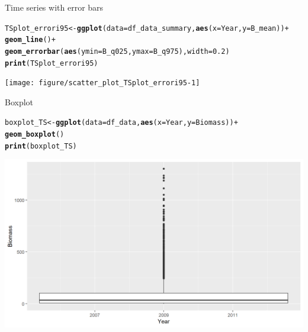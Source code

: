 \documentclass{beamer}\usepackage[]{graphicx}\usepackage[]{color}
\makeatletter
\newcommand{\hlnum}[1]{\textcolor[rgb]{0.686,0.059,0.569}{#1}}%
\newcommand{\hlopt}[1]{\textcolor[rgb]{0,0,0}{#1}}%
\newcommand{\hlstd}[1]{\textcolor[rgb]{0.345,0.345,0.345}{#1}}%
\newcommand{\hlkwb}[1]{\textcolor[rgb]{0.69,0.353,0.396}{#1}}%
\newcommand{\hlkwc}[1]{\textcolor[rgb]{0.333,0.667,0.333}{#1}}%
\newcommand{\hlkwd}[1]{\textcolor[rgb]{0.737,0.353,0.396}{\textbf{#1}}}%
\newenvironment{kframe}{%
 \def\at@end@of@kframe{}%
 \ifinner\ifhmode%
  \def\at@end@of@kframe{\end{minipage}}%
  \begin{minipage}{\columnwidth}%
 \fi\fi%
 \def\FrameCommand##1{\hskip\@totalleftmargin \hskip-\fboxsep
 \colorbox{shadecolor}{##1}\hskip-\fboxsep
     \hskip-\linewidth \hskip-\@totalleftmargin \hskip\columnwidth}%
 \MakeFramed {\advance\hsize-\width
   \@totalleftmargin\z@ \linewidth\hsize
   \@setminipage}}%
 {\par\unskip\endMakeFramed%
 \at@end@of@kframe}
\newenvironment{knitrout}{}{} %
\makeatother
\begin{document}
\begin{frame}[fragile]{Time series with error bars}
\begin{knitrout}\footnotesize
{}\color{fgcolor}\begin{kframe}
\begin{alltt}
\hlstd{TSplot_errori95} \hlkwb{<-} \hlkwd{ggplot}\hlstd{(}\hlkwc{data}\hlstd{=df_data_summary,} \hlkwd{aes}\hlstd{(}\hlkwc{x}\hlstd{=Year,} \hlkwc{y}\hlstd{=B_mean))} \hlopt{+}
  \hlkwd{geom_line}\hlstd{()} \hlopt{+}
  \hlkwd{geom_errorbar}\hlstd{(}\hlkwd{aes}\hlstd{(}\hlkwc{ymin} \hlstd{= B_q025,} \hlkwc{ymax} \hlstd{= B_q975),} \hlkwc{width} \hlstd{=} \hlnum{0.2}\hlstd{)}
\hlkwd{print}\hlstd{(TSplot_errori95)}
\end{alltt}
\end{kframe}

{\centering \texttt{[image: figure/scatter\_plot\_TSplot\_errori95-1]} 

}



\end{knitrout}
\end{frame}

\begin{frame}[fragile]{Boxplot}
\begin{knitrout}\footnotesize
{}\color{fgcolor}\begin{kframe}
\begin{alltt}
\hlstd{boxplot_TS} \hlkwb{<-} \hlkwd{ggplot}\hlstd{(}\hlkwc{data}\hlstd{=df_data,} \hlkwd{aes}\hlstd{(}\hlkwc{x}\hlstd{=Year,} \hlkwc{y}\hlstd{=Biomass))} \hlopt{+}
  \hlkwd{geom_boxplot}\hlstd{()}
\hlkwd{print}\hlstd{(boxplot_TS)}
\end{alltt}


{\ttfamily\noindent\color{warningcolor}{\#\# Warning: Continuous x aesthetic -- did you forget aes(group=...)?}}\end{kframe}

{\centering \includegraphics[width=.9\linewidth]{figure/boxplot_TS-1} 

}



\end{knitrout}
\end{frame}
\end{document}
